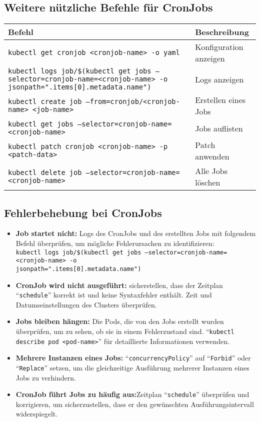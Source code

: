 \subsection{Weitere nützliche Befehle für CronJobs}
\begin{tabular}{|p{}|p{}|}
\hline
\textbf{Befehl} & \textbf{Beschreibung} \\
\hline
\texttt{kubectl get cronjob <cronjob-name> -o yaml} & Konfiguration anzeigen \\
\texttt{kubectl logs job/\$(kubectl get jobs --selector=cronjob-name=<cronjob-name> -o jsonpath="{.items[0].metadata.name}")} & Logs anzeigen \\
\texttt{kubectl create job --from=cronjob/<cronjob-name> <job-name>} & Erstellen eines Jobs \\
\texttt{kubectl get jobs --selector=cronjob-name=<cronjob-name>} & Jobs auflisten \\
\texttt{kubectl patch cronjob <cronjob-name> -p <patch-data>} & Patch anwenden \\
\texttt{kubectl delete job --selector=cronjob-name=<cronjob-name>} & Alle Jobs löschen \\
\hline
\end{tabular}

\subsection{Fehlerbehebung bei CronJobs}
\begin{itemize}
    \item \textbf{Job startet nicht:} Logs des CronJobs und des erstellten Jobs mit folgendem Befehl überprüfen, um mögliche Fehlerursachen zu identifizieren:\\
    \texttt{kubectl logs job/\$(kubectl get jobs --selector=cronjob-name=<cronjob-name> -o\\jsonpath="{.items[0].metadata.name}")}
    \item \textbf{CronJob wird nicht ausgeführt:} sicherstellen, dass der Zeitplan \enquote{\texttt{schedule}} korrekt ist und keine Syntaxfehler enthält. Zeit und Datumseinstellungen des Clusters überprüfen.
    \item \textbf{Jobs bleiben hängen:} Die Pods, die von den Jobs erstellt wurden überprüfen, um zu sehen, ob sie in einem Fehlerzustand sind. \enquote{\texttt{kubectl describe pod <pod-name>}} für detaillierte Informationen verwenden.
    \item \textbf{Mehrere Instanzen eines Jobs:} \enquote{\texttt{concurrencyPolicy}} auf \enquote{\texttt{Forbid}} oder \enquote{\texttt{Replace}} setzen, um die gleichzeitige Ausführung mehrerer Instanzen eines Jobs zu verhindern.
    \item \textbf{CronJob führt Jobs zu häufig aus:}Zeitplan \enquote{\texttt{schedule}} überprüfen und korrigieren, um sicherzustellen, dass er den gewünschten Ausführungsintervall widerspiegelt.
\end{itemize}
\newpage
